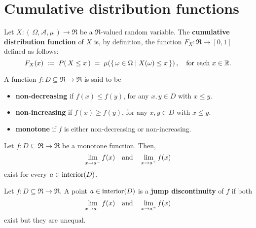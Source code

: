 

\section{Cumulative distribution functions}
\setcounter{theorem}{0}
\setcounter{equation}{0}

\begin{definition}\quad
Let $X : \left(\,\Omega,\mathcal{A},\mu\,\right) \longrightarrow \Re$ be a $\Re$-valued random variable.
The \textbf{cumulative distribution function} of $X$ is, by definition, the function
$F_{X} : \Re \longrightarrow [0,1]$ defined as follows:
\begin{equation*}
F_{X}(x) \; := \; P\!\left(\,X \leq x\,\right) \; = \; \mu\!\left(\left\{\,\omega \in \Omega \;\vert\; X(\omega) \leq x \,\right\}\right),
\quad
\textnormal{for each $x \in \Re$}.
\end{equation*}
\end{definition}

\begin{definition}\quad
A function $f : D \subseteq \Re \longrightarrow \Re$ is said to be 
\begin{itemize}
\item	\textbf{non-decreasing} if $f(x) \leq f(y)$, for any $x, y \in D$ with $x \leq y$.
\item	\textbf{non-increasing} if $f(x) \geq f(y)$, for any $x, y \in D$ with $x \leq y$.
\item	\textbf{monotone} if $f$ is either non-decreasing or non-increasing.
\end{itemize}
\end{definition}

\begin{theorem}\quad
Let $f : D \subseteq \Re \longrightarrow \Re$ be a monotone function.
Then,
\begin{equation*}
\lim_{x \rightarrow a^{-}} f(x)
\quad\textnormal{and}\quad
\lim_{x \rightarrow a^{+}} f(x)
\end{equation*}
exist for every $a \in \textnormal{interior}(D)$.
\end{theorem}

\begin{definition}\quad
Let $f : D \subseteq \Re \longrightarrow \Re$.
A point $a \in \textnormal{interior}(D)$ is a \textbf{jump discontinuity} of $f$ if both
\begin{equation*}
\lim_{x \rightarrow a^{-}} f(x)
\quad\textnormal{and}\quad
\lim_{x \rightarrow a^{+}} f(x)
\end{equation*}
exist but they are unequal.
\end{definition}

